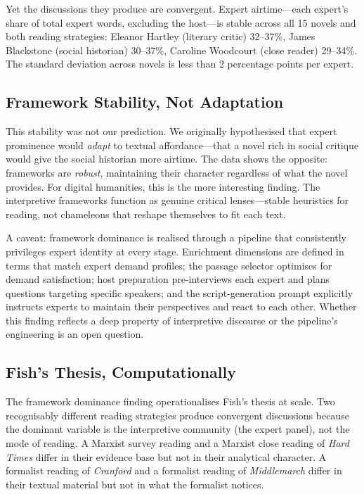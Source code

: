 \documentclass[final]{clv2025}
\begin{document}
Yet the discussions they produce are convergent.  Expert
airtime---each expert's share of total expert words, excluding the
host---is stable across all 15 novels and both reading strategies:
Eleanor Hartley (literary critic) 32--37\%, James Blackstone (social
historian) 30--37\%, Caroline Woodcourt (close reader) 29--34\%.  The
standard deviation across novels is less than 2 percentage points per
expert.

\subsection{Framework Stability, Not Adaptation}

This stability was not our prediction.  We originally hypothesised that
expert prominence would \emph{adapt} to textual affordance---that a
novel rich in social critique would give the social historian more
airtime.  The data shows the opposite: frameworks are \emph{robust},
maintaining their character regardless of what the novel provides.  For
digital humanities, this is the more interesting finding.  The
interpretive frameworks function as genuine critical lenses---stable
heuristics for reading, not chameleons that reshape themselves to fit
each text.

A caveat: framework dominance is realised through a pipeline that
consistently privileges expert identity at every stage.  Enrichment
dimensions are defined in terms that match expert demand profiles;
the passage selector optimises for demand satisfaction; host
preparation pre-interviews each expert and plans questions targeting
specific speakers; and the script-generation prompt explicitly
instructs experts to maintain their perspectives and react to each
other.  Whether this finding reflects a deep property of interpretive
discourse or the pipeline's engineering is an open question.

\subsection{Fish's Thesis, Computationally}

The framework dominance finding operationalises Fish's thesis at scale.  Two
recognisably different reading strategies produce convergent
discussions because the dominant variable is the interpretive community
(the expert panel), not the mode of reading.  A Marxist survey reading
and a Marxist close reading of \textit{Hard Times} differ in their
evidence base but not in their analytical character.  A formalist
reading of \textit{Cranford} and a formalist reading of
\textit{Middlemarch} differ in their textual material but not in what
the formalist notices.
\end{document}
